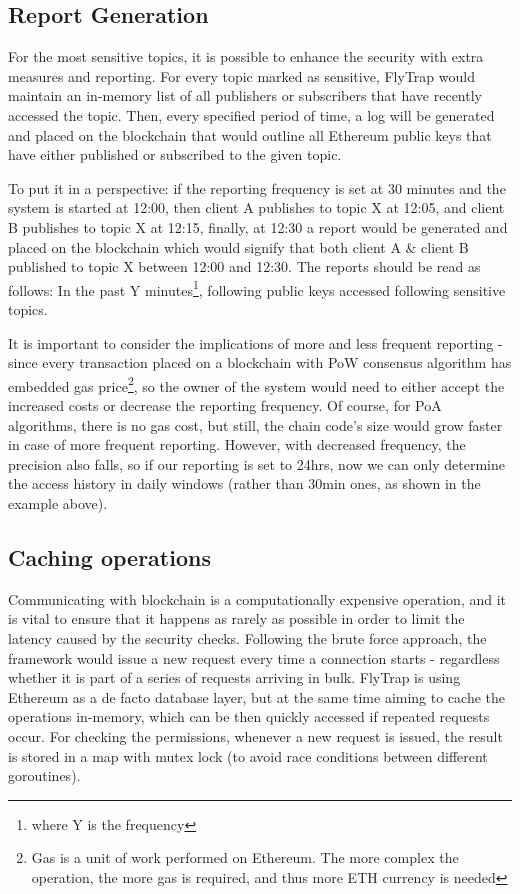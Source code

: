 \subsection{Report Generation}\label{sec:reports}
For the most sensitive topics, it is possible to enhance the security with extra measures and reporting. For every topic marked as sensitive, FlyTrap would maintain an in-memory list of all publishers or subscribers that have recently accessed the topic. Then, every specified period of time, a log will be generated and placed on the blockchain that would outline all Ethereum public keys that have either published or subscribed to the given topic.

To put it in a perspective: if the reporting frequency is set at 30 minutes and the system is started at 12:00, then client A publishes to topic  X at 12:05, and client B publishes to topic X at 12:15, finally, at 12:30 a report would be generated and placed on the blockchain which would signify that both client A \& client B published to topic X between 12:00 and 12:30. The reports should be read as follows: In the past Y minutes\footnote{where Y is the frequency}, following public keys accessed following sensitive topics. 

It is important to consider the implications of more and less frequent reporting - since every transaction placed on a blockchain with PoW consensus algorithm has embedded gas price\footnote{Gas is a unit of work performed on Ethereum. The more complex the operation, the more gas is required, and thus more ETH currency is needed}, so the owner of the system would need to either accept the increased costs or decrease the reporting frequency. Of course, for PoA algorithms, there is no gas cost, but still, the chain code's size would grow faster in case of more frequent reporting. However, with decreased frequency, the precision also falls, so if our reporting is set to 24hrs, now we can only determine the access history in daily windows (rather than 30min ones, as shown in the example above).
\subsection{Caching operations}
Communicating with blockchain is a computationally expensive operation, and it is vital to ensure that it happens as rarely as possible in order to limit the latency caused by the security checks. Following the brute force approach, the framework would issue a new request every time a connection starts - regardless whether it is part of a series of requests arriving in bulk. FlyTrap is using Ethereum as a de facto database layer, but at the same time aiming to cache the operations in-memory, which can be then quickly accessed if repeated requests occur. For checking the permissions, whenever a new request is issued, the result is stored in a map with mutex lock (to avoid race conditions between different goroutines).

